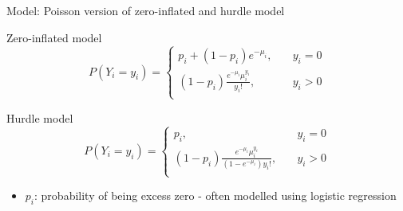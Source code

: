 \documentclass{beamer}\usepackage[]{graphicx}\usepackage[]{color}
\begin{document}
\begin{frame}[fragile]{Model: Poisson version of zero-inflated and hurdle model}
\begin{center}
\begin{block}{Zero-inflated model}
\begin{equation*}
P(Y_i = y_i) = \begin{cases}
    p_i + \left(1 - p_i\right) e^{-\mu_i},                     & \quad y_i = 0\\
    \left(1 - p_i\right) \frac{e^{-\mu_i}\mu_i^{y_i}}{y_i!},   & \quad y_i > 0\\
  \end{cases}
\end{equation*}
\end{block}

\begin{block}{Hurdle model}
\begin{equation*}
P(Y_i = y_i) = \begin{cases}
    p_i,                                                                               & \quad y_i = 0\\
    \left(1 - p_i\right) \frac{e^{-\mu_i}\mu_i^{y_i}}{\left(1-e^{-\mu_i}\right)y_i!},  & \quad y_i > 0\\
  \end{cases}
\end{equation*}
\end{block}
\begin{itemize}
  \item $p_i$: probability of being excess zero - often modelled using logistic regression
\end{itemize}
\end{center}
\end{frame}
\end{document}
